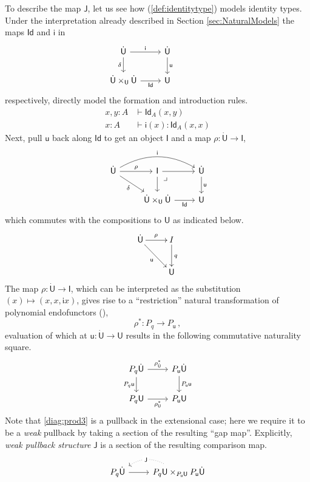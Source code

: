 \documentclass[12pt,reqno]{amsart}
\renewcommand{\to}{\ensuremath{\rightarrow}}
\newcommand{\Id}{\mathsf{Id}}
\renewcommand{\t}{\ensuremath{\mathsf{u}}}
\newcommand{\T}{\ensuremath{\mathsf{U}}}
\newcommand{\TT}{\ensuremath{\dot{\mathsf{U}}}}
\newcommand{\pbcorner}{\arrow[dr,phantom,"\lrcorner" very near start, shift right=.5ex]} %
\theoremstyle{remark}
\theoremstyle{definition}
\begin{document}
To describe the map $\mathsf{J}$, let us see how (\ref{def:identitytype}) models identity types.  Under the interpretation already described in Section \ref{sec:NaturalModels} the maps $\Id$ and $\mathsf{i}$  in 
\begin{equation*}%
\begin{tikzcd}
	\TT \ar[r,"\mathsf{i}"] \ar[d,swap,"\delta"] &  \TT \ar[d, "\t"]\\  
	\TT \times_\T \TT \ar[r, swap,"\mathsf{Id}"] & \T
 \end{tikzcd}\qquad \qquad 
 \end{equation*}
respectively, directly model the formation and introduction rules.
\begin{align*}
x, y:A &\vdash \Id_A(x, y)\\
x: A &\vdash \mathsf{i}(x) : \Id_A(x, x)
\end{align*}
Next, pull $\t$ back along $\mathsf{Id}$ to get an object $\mathsf{I}$ and a map $\rho  : \TT \to \mathsf{I}$,
%
\begin{equation*}
\begin{tikzcd}
\TT \ar[rd,swap,"{\delta}"] \ar[r,"{\rho}"] \ar[rr, bend left,"{\mathsf{i}}"] & \mathsf{I} \ar[r]  \ar[d] \pbcorner &  \TT \ar[d, "\t"]\\
& \TT \times_\T \TT  \ar[r, swap,"{\mathsf{Id}}"]  & \T
\end{tikzcd}
\end{equation*}
%
which commutes with the compositions to $\T$ as indicated below.
%
\begin{equation*}
\xymatrix{
\TT \ar[rd]_{\t} \ar[r]^{\rho} & I \ar[d]^{q}  \\
& \T 
}
\end{equation*}
%
The map $\rho  : \TT \to \mathsf{I}$, which can be interpreted as the substitution $(x) \mapsto (x, x, \mathsf{i}x)$, gives rise to a ``restriction'' natural transformation of polynomial endofunctors (\cite{GambinoKoch:2013}),
\[
\rho^* : P_q \to P_\t\,,
\]
evaluation of which at $\t:\TT \to\T$ results in the following commutative naturality square.
\begin{equation}\label{diag:prod3}
\begin{tikzcd}
P_q\TT \ar[d,swap, "{P_q \t}"] \ar[r, "{\rho^{*}_{\TT}}"] & P_\t\TT \ar[d, "{P_\t \t}"] \\
P_q\T \ar[r,swap, "{\rho^{*}_{\T}}"] &  P_\t\T 
\end{tikzcd}
\end{equation}
%
Note that \eqref{diag:prod3} is a pullback in the extensional case; here we require it to be a \emph{weak} pullback by taking a section of the resulting ``gap map''.   Explicitly, \emph{weak pullback structure} $\mathsf{J}$ is a section of the resulting comparison map.
\begin{equation}\label{def:wps}
\begin{tikzcd}
P_q \TT  \ar[r] & \ar[l, bend right, dotted, "\mathsf{J}" description] P_q\T \times_{P_\t\T} P_\t\TT 
\end{tikzcd}
\end{equation}
\end{document}
